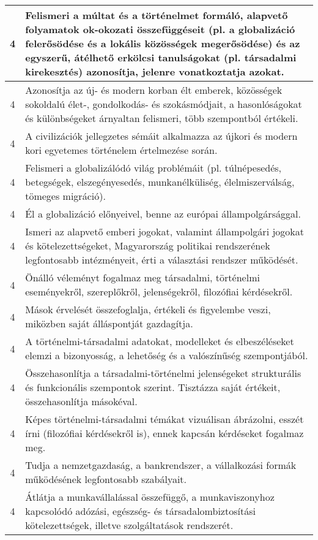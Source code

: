 \begin{longtable}{c | p{12cm} }
                                
                                          4 &  Felismeri a múltat és a történelmet formáló, alapvető folyamatok ok-okozati összefüggéseit (pl. a globalizáció felerősödése és a lokális közösségek megerősödése) és az egyszerű, átélhető erkölcsi tanulságokat (pl. társadalmi kirekesztés) azonosítja, jelenre vonatkoztatja azokat. \\ \hline
                                          4 &  Azonosítja az új- és modern korban élt emberek, közösségek sokoldalú élet-, gondolkodás- és szokásmódjait, a hasonlóságokat és különbségeket árnyaltan felismeri, több szempontból értékeli. \\ \hline
                                          4 &  A civilizációk jellegzetes sémáit alkalmazza az újkori és modern kori egyetemes történelem értelmezése során. \\ \hline
                                          4 &  Felismeri a globalizálódó világ problémáit (pl. túlnépesedés, betegségek, elszegényesedés, munkanélküliség, élelmiszerválság, tömeges migráció). \\ \hline
                                          4 &  Él a globalizáció előnyeivel, benne az európai állampolgársággal. \\ \hline
                                          4 &  Ismeri az alapvető emberi jogokat, valamint állampolgári jogokat és kötelezettségeket, Magyarország politikai rendszerének legfontosabb intézményeit, érti a választási rendszer működését. \\ \hline
                                          4 &  Önálló véleményt fogalmaz meg társadalmi, történelmi eseményekről, szereplőkről, jelenségekről, filozófiai kérdésekről. \\ \hline
                                          4 &  Mások érvelését összefoglalja, értékeli és figyelembe veszi, miközben saját álláspontját gazdagítja. \\ \hline
                                          4 &  A történelmi-társadalmi adatokat, modelleket és elbeszéléseket elemzi a bizonyosság, a lehetőség és a valószínűség szempontjából. \\ \hline
                                          4 &  Összehasonlítja a társadalmi-történelmi jelenségeket strukturális és funkcionális szempontok szerint. Tisztázza saját értékeit, összehasonlítja másokéval. \\ \hline
                                          4 &  Képes történelmi-társadalmi témákat vizuálisan ábrázolni, esszét írni (filozófiai kérdésekről is), ennek kapcsán kérdéseket fogalmaz meg. \\ \hline
                                          4 &  Tudja a nemzetgazdaság, a bankrendszer, a vállalkozási formák működésének legfontosabb szabályait. \\ \hline
                                          4 &  Átlátja a munkavállalással összefüggő, a munkaviszonyhoz kapcsolódó adózási, egészség- és társadalombiztosítási kötelezettségek, illetve szolgáltatások rendszerét. \\ \hline
                                      
                        \end{longtable}
